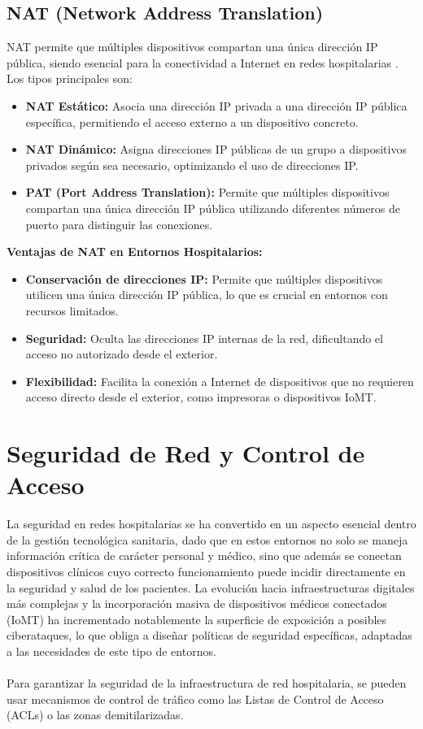 \subsection{NAT (Network Address Translation)}
\label{subsec:nat}
\acs{NAT} permite que múltiples dispositivos compartan una única dirección \acs{IP} pública, siendo esencial para la conectividad a Internet en redes hospitalarias \cite{cisco-hospital-design}. Los tipos principales son:
\begin{itemize}
    \item \textbf{\acs{NAT} Estático:} Asocia una dirección \acs{IP} privada a una dirección \acs{IP} pública específica, permitiendo el acceso externo a un dispositivo concreto.
    \item \textbf{\acs{NAT} Dinámico:} Asigna direcciones \acs{IP} públicas de un grupo a dispositivos privados según sea necesario, optimizando el uso de direcciones \acs{IP}.
    \item \textbf{\acs{PAT} (Port Address Translation):} Permite que múltiples dispositivos compartan una única dirección \acs{IP} pública utilizando diferentes números de puerto para distinguir las conexiones.
\end{itemize}

\textbf{Ventajas de \acs{NAT} en Entornos Hospitalarios:}
\begin{itemize}
    \item \textbf{Conservación de direcciones \acs{IP}:} Permite que múltiples dispositivos utilicen una única dirección \acs{IP} pública, lo que es crucial en entornos con recursos limitados.
    \item \textbf{Seguridad:} Oculta las direcciones \acs{IP} internas de la red, dificultando el acceso no autorizado desde el exterior.
    \item \textbf{Flexibilidad:} Facilita la conexión a Internet de dispositivos que no requieren acceso directo desde el exterior, como impresoras o dispositivos \acs{IoMT}.
\end{itemize}

\section{Seguridad de Red y Control de Acceso}
La seguridad en redes hospitalarias se ha convertido en un aspecto esencial dentro de la gestión tecnológica sanitaria, dado que en estos entornos no solo se maneja información 
crítica de carácter personal y médico, sino que además se conectan dispositivos clínicos cuyo correcto funcionamiento puede incidir directamente en la seguridad y salud de 
los pacientes. La evolución hacia infraestructuras digitales más complejas y la incorporación masiva de dispositivos médicos conectados (\acs{IoMT}) ha incrementado notablemente 
la superficie de exposición a posibles ciberataques, lo que obliga a diseñar políticas de seguridad específicas, adaptadas a las necesidades de este tipo de entornos.
\\ \\
Para garantizar la seguridad de la infraestructura de red hospitalaria, se pueden usar mecanismos de control de tráfico como las Listas de Control de Acceso (\acs{ACL}s) o las zonas demitilarizadas. 

